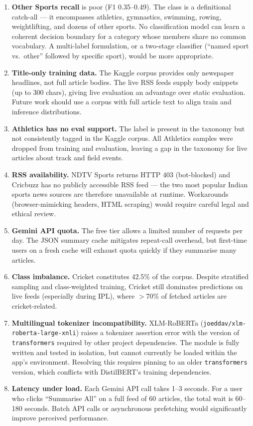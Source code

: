 \documentclass[11pt,a4paper]{article}
\begin{document}
\begin{enumerate}[noitemsep,leftmargin=*]
  \item \textbf{Other Sports recall} is poor (F1 0.35--0.49). The class is a definitional catch-all — it encompasses athletics, gymnastics, swimming, rowing, weightlifting, and dozens of other sports. No classification model can learn a coherent decision boundary for a category whose members share no common vocabulary. A multi-label formulation, or a two-stage classifier (``named sport vs.\ other'' followed by specific sport), would be more appropriate.
  \item \textbf{Title-only training data.} The Kaggle corpus provides only newspaper headlines, not full article bodies. The live RSS feeds supply body snippets (up to 300 chars), giving live evaluation an advantage over static evaluation. Future work should use a corpus with full article text to align train and inference distributions.
  \item \textbf{Athletics has no eval support.} The label is present in the taxonomy but not consistently tagged in the Kaggle corpus. All Athletics samples were dropped from training and evaluation, leaving a gap in the taxonomy for live articles about track and field events.
  \item \textbf{RSS availability.} NDTV Sports returns HTTP 403 (bot-blocked) and Cricbuzz has no publicly accessible RSS feed — the two most popular Indian sports news sources are therefore unavailable at runtime. Workarounds (browser-mimicking headers, HTML scraping) would require careful legal and ethical review.
  \item \textbf{Gemini API quota.} The free tier allows a limited number of requests per day. The JSON summary cache mitigates repeat-call overhead, but first-time users on a fresh cache will exhaust quota quickly if they summarise many articles.
  \item \textbf{Class imbalance.} Cricket constitutes 42.5\% of the corpus. Despite stratified sampling and class-weighted training, Cricket still dominates predictions on live feeds (especially during IPL), where $>$70\% of fetched articles are cricket-related.
  \item \textbf{Multilingual tokenizer incompatibility.} XLM-RoBERTa (\texttt{joeddav/xlm-roberta-large-xnli}) raises a tokenizer assertion error with the version of \texttt{transformers} required by other project dependencies. The module is fully written and tested in isolation, but cannot currently be loaded within the app's environment. Resolving this requires pinning to an older \texttt{transformers} version, which conflicts with DistilBERT's training dependencies.
  \item \textbf{Latency under load.} Each Gemini API call takes 1--3 seconds. For a user who clicks ``Summarise All'' on a full feed of 60 articles, the total wait is 60--180 seconds. Batch API calls or asynchronous prefetching would significantly improve perceived performance.
\end{enumerate}
\end{document}

